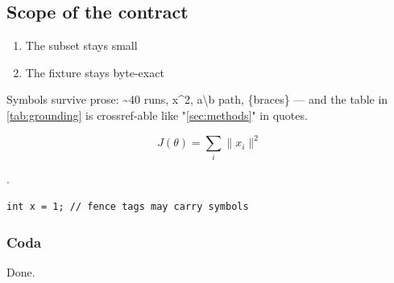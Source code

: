 \begin{table}[tb]
  \caption{Grounding beats retrieval alone \cite{vaswani2017}; mean ; details in \cref{sec:methods}.}
  \label{tab:grounding}
\end{table}

\subsection{Scope of the contract}

\begin{enumerate}
  \item The subset stays small
  \item The fixture stays byte-exact
\end{enumerate}
Symbols survive prose: \textasciitilde{}40 runs, x\textasciicircum{}2, a\textbackslash{}b path, \{braces\} — and the table in \cref{tab:grounding} is crossref-able like "\cref{sec:methods}" in quotes.

\[J(\theta) = \sum_i \|x_i\|^2\]

.

\begin{verbatim}
int x = 1; // fence tags may carry symbols
\end{verbatim}

\subsubsection{Coda}

Done.
